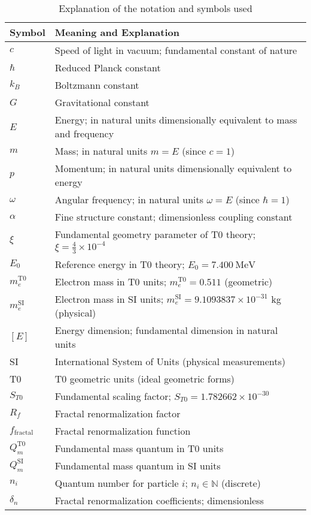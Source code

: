 \documentclass[12pt,a4paper]{article}
\begin{document}
	\begin{table}[h]
		\centering
		\begin{tabular}{p{3cm}p{10cm}}
			\toprule
			\textbf{Symbol} & \textbf{Meaning and Explanation} \\
			\midrule
			$c$ & Speed of light in vacuum; fundamental constant of nature \\
			$\hbar$ & Reduced Planck constant \\
			$k_B$ & Boltzmann constant \\
			$G$ & Gravitational constant \\
			$E$ & Energy; in natural units dimensionally equivalent to mass and frequency \\
			$m$ & Mass; in natural units $m = E$ (since $c=1$) \\
			$p$ & Momentum; in natural units dimensionally equivalent to energy \\
			$\omega$ & Angular frequency; in natural units $\omega = E$ (since $\hbar=1$) \\
			$\alpha$ & Fine structure constant; dimensionless coupling constant \\
			$\xi$ & Fundamental geometry parameter of T0 theory; $\xi = \frac{4}{3} \times 10^{-4}$ \\
			$E_0$ & Reference energy in T0 theory; $E_0 = 7.400~\mathrm{MeV}$ \\
			$m_e^{\mathrm{T0}}$ & Electron mass in T0 units; $m_e^{\mathrm{T0}} = 0.511$ (geometric) \\
			$m_e^{\mathrm{SI}}$ & Electron mass in SI units; $m_e^{\mathrm{SI}} = 9.1093837\times 10^{-31}$ kg (physical) \\
			$[E]$ & Energy dimension; fundamental dimension in natural units \\
			SI & International System of Units (physical measurements) \\
			T0 & T0 geometric units (ideal geometric forms) \\
			$S_{T0}$ & Fundamental scaling factor; $S_{T0} = 1.782662 \times 10^{-30}$ \\
			$R_f$ & Fractal renormalization factor \\
			$f_{\text{fractal}}$ & Fractal renormalization function \\
			$Q_m^{\mathrm{T0}}$ & Fundamental mass quantum in T0 units \\
			$Q_m^{\mathrm{SI}}$ & Fundamental mass quantum in SI units \\
			$n_i$ & Quantum number for particle $i$; $n_i \in \mathbb{N}$ (discrete) \\
			$\delta_n$ & Fractal renormalization coefficients; dimensionless \\
			\bottomrule
		\end{tabular}
		\caption{Explanation of the notation and symbols used}
	\end{table}
	
\end{document}
